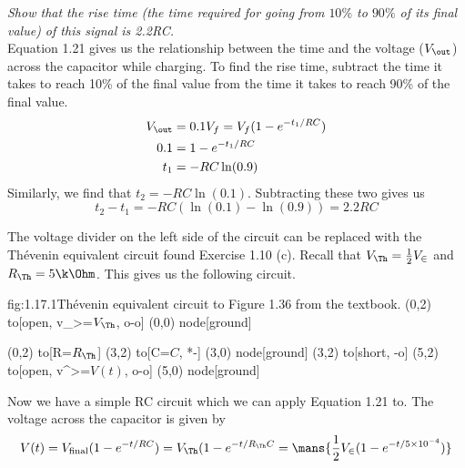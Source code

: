 \documentclass{article}
\begin{document}

    \textit{Show that the rise time (the time required for going from $10\%$ to $90\%$ of its final value) of this signal is 2.2RC.}\\

    Equation 1.21 gives us the relationship between the time and the voltage ($V_\out$) across the capacitor while charging. To find the rise time, subtract the time it takes to reach 10\% of the final value from the time it takes to reach 90\% of the final value.
    \begin{align*}
        V_\out &= 0.1V_f = V_f(1-e^{-t_1/RC}) \\
        0.1 &= 1 - e^{-t_1/RC}\\ 
        t_1 &= -RC \ln(0.9)
    \end{align*}
    Similarly, we find that $t_2 = -RC \ln(0.1)$. Subtracting these two gives us 
    \[t_2 - t_1 = -RC(\ln(0.1) - \ln(0.9)) = 2.2RC\]

    The voltage divider on the left side of the circuit can be replaced with the Th\'evenin equivalent circuit found Exercise 1.10 (c). Recall that $V_\Th = \frac{1}{2} V_\in$ and $R_\Th = 5\k\Ohm$. This gives us the following circuit.
    \begin{circuit}{fig:1.17.1}{Th\'evenin equivalent circuit to Figure 1.36 from the textbook.}
        (0,2) to[open, v_>=$V_\Th$, o-o] (0,0) node[ground]{}
        
        (0,2) to[R=$R_\Th$] (3,2)
            to[C=$C$, *-] (3,0) node[ground]{}
        (3,2) to[short, -o] (5,2)
        to[open, v^>=$V(t)$, o-o] (5,0) node[ground]{}
    \end{circuit}

    Now we have a simple RC circuit which we can apply Equation 1.21 to. The voltage across the capacitor is given by 
    \[V(t) = V_\text{final}(1 - e^{-t/RC}) = V_\Th (1 - e^{-t/R_\Th C} = \mans{\frac{1}{2}V_\in (1 - e^{-t/5 \times 10^{-4}})}\]
\end{document}
